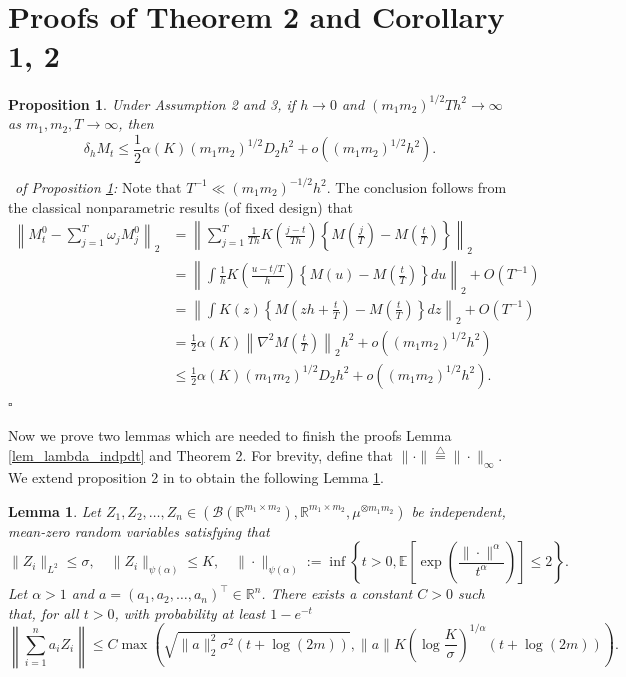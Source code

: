 \documentclass[12pt]{article}
\newtheorem{prop}{Proposition}
\newtheorem{lemma}{Lemma}
\newenvironment{pf}{{\noindent\it Proof}\ }{\hfill $\square$\par}
\begin{document}
\section{Proofs of Theorem 2 and Corollary 1, 2}
 \begin{prop}\label{prop:bias}
  Under Assumption 2 and 3, if $h\rightarrow0$ and $(m_1m_2)^{1/2}Th^2\rightarrow\infty$ as $m_1,m_2,T\rightarrow\infty$, then
  \begin{equation*}
  \delta_h M_t\le\frac{1}{2} \alpha(K)(m_1m_2)^{1/2}D_2 h^2+o\left((m_1m_2)^{1/2}h^2\right).
  \end{equation*}
  \end{prop}
  \begin{pf}{\it of Proposition \ref{prop:bias}:} 
  Note that $T^{-1}\ll (m_1m_2)^{-1/2}h^2$.
  The conclusion follows from the classical nonparametric results (of fixed design) that
  \begin{align*}
  \left\|M_t^0 - \sum_{j=1}^T \omega_j M_j^0\right\|_2 
  &= \left\|\sum_{j=1}^T \frac{1}{Th}K\left(\frac{j-t}{Th}\right) \left\{M\left(\frac{j}{T}\right)-  M\left(\frac{t}{T}\right)\right\}\right\|_2\\ 
  &= \left\|\int\frac{1}{h}K\left(\frac{u-t/T}{h}\right)\left\{M(u)-M\left(\frac{t}{T}\right)\right\}du \right\|_2+O\left(T^{-1}\right)\\ 
  &=\left\|\int K(z)\left\{M\left(zh+\frac{t}{T}\right)-M\left(\frac{t}{T}\right)\right\}dz\right\|_2+O\left(T^{-1}\right)\\ 
  &=\frac{1}{2}\alpha(K)\left\|\nabla^2M(\frac{t}{T})\right\|_2  h^2+o\left((m_1m_2)^{1/2}h^2\right)\\ 
  &\le \frac{1}{2} \alpha(K)(m_1m_2)^{1/2}D_2 h^2+o\left((m_1m_2)^{1/2}h^2\right).
  \end{align*}
  \end{pf}  

  Now we prove two lemmas  which are needed to finish the proofs Lemma \ref{lem_lambda_indpdt} and Theorem 2. For brevity, define that $\|\cdot\|\overset{\triangle}{=}\|\cdot\|_\infty$. 
  We extend proposition 2 in \cite{koltchinskii2011neumann} to obtain the following Lemma \ref{bernstein_lemma}.
  \begin{lemma}
  \label{bernstein_lemma}
  Let $Z_1,Z_2,\dots,Z_n\in (\mathcal{B}(\mathbb{R}^{m_1\times m_2}), \mathbb{R}^{m_1\times m_2}, \mu^{\otimes m_1m_2})$ be independent, mean-zero 
  random variables satisfying that $$\|Z_i\|_{L^2} \le \sigma,\quad \|Z_i\|_{\psi(\alpha)} \le K, \quad \|\cdot\|_{\psi(\alpha)}:= \inf\left\{t>0,\mathbb{E}\left[\exp\left(\frac{\|\cdot\|^\alpha}{t^\alpha}\right)\right]\le 2
  \right\}.$$
  Let $\alpha >1$ and $a=(a_1,a_2,\dots,a_n)^\top\in \mathbb{R}^n$. There exists a constant $C>0$ such that, for all $t>0$, with probability at least $1-e^{-t}$
  \begin{equation}
  \label{bernstein_ineq}
  \left\|\sum_{i=1}^n a_i Z_i\right\|\le C\max \left(\sqrt{\|a\|_2^2 \sigma^2(t+\log(2m))}, \|a\| K\left(\log \frac{K}{\sigma}\right)^{1/\alpha}(t + \log(2m))\right).
  \end{equation}
  \end{lemma}
\end{document}
